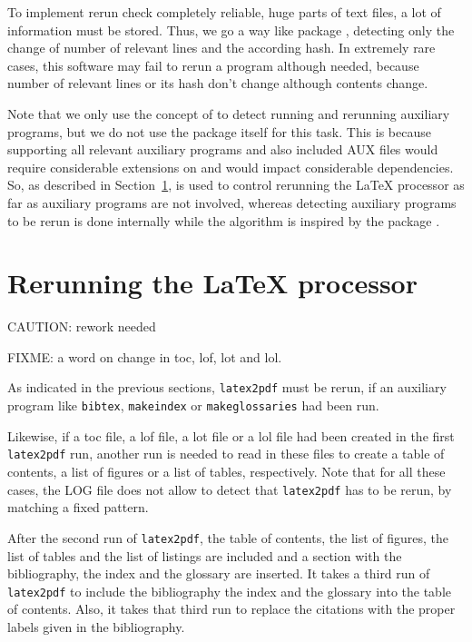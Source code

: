 To implement rerun check completely reliable, 
huge parts of text files, a lot of information must be stored. 
Thus, we go a way like package , 
detecting only the change of number of relevant lines and the according hash. 
In extremely rare cases, this software may fail to rerun a program although needed, 
because number of relevant lines or its hash don't change 
although contents change. 

Note that we only use the concept of  
to detect running and rerunning auxiliary programs, 
but we do not use the package  itself for this task. 
This is because supporting all relevant auxiliary programs and also 
included AUX files would require considerable extensions on  
and would impact considerable dependencies. 
So, as described in Section~\ref{sec:rerunLatex}, 
 is used to control rerunning the \LaTeX{} processor 
as far as auxiliary programs are not involved, 
whereas detecting auxiliary programs to be rerun is done internally 
while the algorithm is inspired by the package . 


\section{Rerunning the \LaTeX{} processor}\label{sec:rerunLatex}

CAUTION: rework needed 

FIXME\@: a word on change in toc, lof, lot and lol. 

As indicated in the previous sections, 
\texttt{latex2pdf} must be rerun, 
if an auxiliary program like \texttt{bibtex}, \texttt{makeindex} 
or \texttt{makeglossaries} 
had been run. 

Likewise, if a toc file, a lof file, a lot file or a lol file
had been created in the first \texttt{latex2pdf} run, 
another run is needed to read in these files 
to create a table of contents, a list of figures or a list of tables, 
respectively. 
Note that for all these cases, 
the LOG file does not allow to detect that \texttt{latex2pdf} has to be rerun, 
by matching a fixed pattern. 

After the second run of \texttt{latex2pdf}, 
the table of contents,
the list of figures, the list of tables and the list of listings 
are included and a section with the bibliography, 
the index and the glossary are inserted. 
It takes a third run of \texttt{latex2pdf} 
to include the bibliography the index and the glossary 
into the table of contents. 
Also, it takes that third run to replace the citations 
with the proper labels given in the bibliography. 

